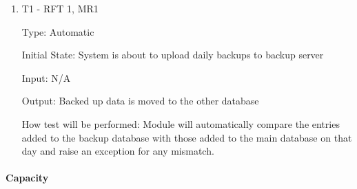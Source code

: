 \documentclass[12pt, titlepage]{article}
\begin{document}
\begin{enumerate}

\item{T1 - RFT 1, MR1\\}

Type: Automatic

Initial State: System is about to upload daily backups to backup server

Input: N/A

Output: Backed up data is moved to the other database

How test will be performed: Module will automatically compare the entries added to the backup database with those added to the main database on that day and raise an exception for any mismatch.

\end{enumerate}

\paragraph{Capacity}
\end{document}
